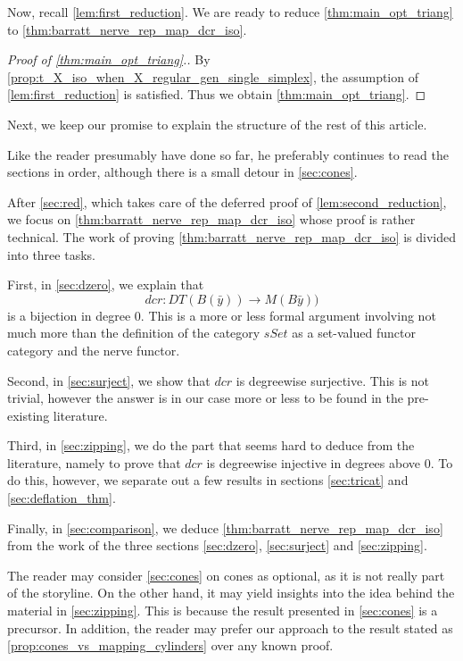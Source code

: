 Now, recall \cref{lem:first_reduction}. We are ready to reduce \cref{thm:main_opt_triang} to \cref{thm:barratt_nerve_rep_map_dcr_iso}.
\begin{proof}[Proof of \cref{thm:main_opt_triang}.]
By \cref{prop:t_X_iso_when_X_regular_gen_single_simplex}, the assumption of \cref{lem:first_reduction} is satisfied. Thus we obtain \cref{thm:main_opt_triang}.
\end{proof}
\noindent Next, we keep our promise to explain the structure of the rest of this article.

Like the reader presumably have done so far, he preferably continues to read the sections in order, although there is a small detour in \cref{sec:cones}.

After \cref{sec:red}, which takes care of the deferred proof of \cref{lem:second_reduction}, we focus on \cref{thm:barratt_nerve_rep_map_dcr_iso} whose proof is rather technical. The work of proving \cref{thm:barratt_nerve_rep_map_dcr_iso} is divided into three tasks.

First, in \cref{sec:dzero}, we explain that
\[dcr:DT(B(\bar{y} ))\to M(B\bar{y} ))\]
is a bijection in degree $0$. This is a more or less formal argument involving not much more than the definition of the category $sSet$ as a set-valued functor category and the nerve functor.

Second, in \cref{sec:surject}, we show that $dcr$ is degreewise surjective. This is not trivial, however the answer is in our case more or less to be found in the pre-existing literature.

Third, in \cref{sec:zipping}, we do the part that seems hard to deduce from the literature, namely to prove that $dcr$ is degreewise injective in degrees above $0$. To do this, however, we separate out a few results in sections \ref{sec:tricat} and \ref{sec:deflation_thm}.

Finally, in \cref{sec:comparison}, we deduce \cref{thm:barratt_nerve_rep_map_dcr_iso} from the work of the three sections \ref{sec:dzero}, \ref{sec:surject} and \ref{sec:zipping}.

The reader may consider \cref{sec:cones} on cones as optional, as it is not really part of the storyline. On the other hand, it may yield insights into the idea behind the material in \cref{sec:zipping}. This is because the result presented in \cref{sec:cones} is a precursor. In addition, the reader may prefer our approach to the result stated as \cref{prop:cones_vs_mapping_cylinders} over any known proof.

